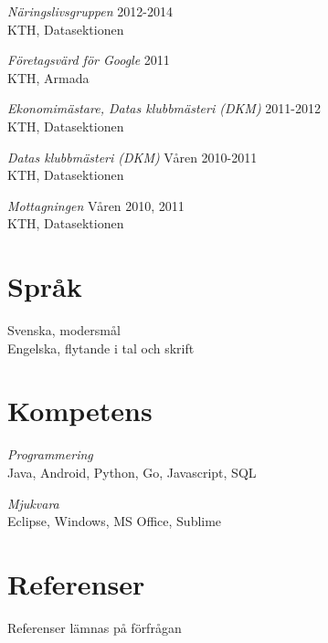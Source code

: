 \documentclass[margin, 10pt]{res} %
\begin{document}
\begin{resume}
{\sl Näringslivsgruppen} \hfill 2012-2014 \\
KTH, Datasektionen

{\sl Företagsvärd för Google} \hfill 2011 \\
KTH, Armada

{\sl Ekonomimästare, Datas klubbmästeri (DKM)} \hfill 2011-2012 \\
KTH, Datasektionen

{\sl Datas klubbmästeri (DKM)} \hfill Våren 2010-2011 \\
KTH, Datasektionen

{\sl Mottagningen} \hfill Våren 2010, 2011 \\
KTH, Datasektionen


\section{Språk}
Svenska, modersmål \\
Engelska, flytande i tal och skrift


\section{Kompetens}
{\sl Programmering} \\
Java, Android, Python, Go, Javascript, SQL

{\sl Mjukvara} \\
Eclipse, Windows, MS Office, Sublime


\section{Referenser}
Referenser lämnas på förfrågan


\end{resume}
\end{document}
